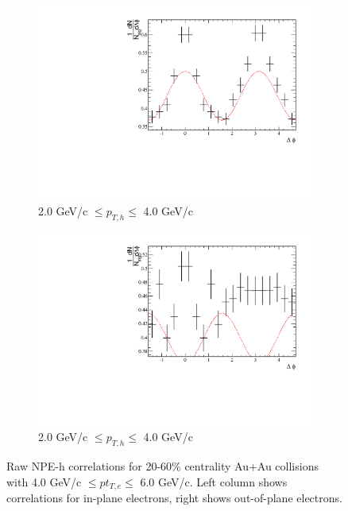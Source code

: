 \begin{figure}[htbp]
\begin{subfigure}{0.5\textwidth}
		\includegraphics[width=\textwidth]{Plots/Correlations/EP/raw/NPE_eh_corr_raw_inplane_primpt_4_5_cent_2_5_assopt_3_4.pdf}
		\caption{2.0 GeV/c $\leq p_{T,h} \leq$ 4.0 GeV/c}
		\label{fig:EP_corr_raw_e}
	\end{subfigure}	
	\begin{subfigure}{0.5\textwidth}
		\includegraphics[width=\textwidth]{Plots/Correlations/EP/raw/NPE_eh_corr_raw_outofplane_primpt_4_5_cent_2_5_assopt_3_4.pdf}
		\caption{2.0 GeV/c $\leq p_{T,h} \leq$ 4.0 GeV/c}
		\label{fig:EP_corr_raw_f}
	\end{subfigure}	
\caption[Raw NPE-hadron Correlations, In-plane and Out-of-plane]{Raw NPE-h correlations for 20-60\% centrality Au+Au collisions with 4.0 GeV/c $\leq pt_{T,e} \leq$ 6.0 GeV/c. Left column shows correlations for in-plane electrons, right shows out-of-plane electrons.}
\label{fig:EP_corr_raw}
\end{figure}

